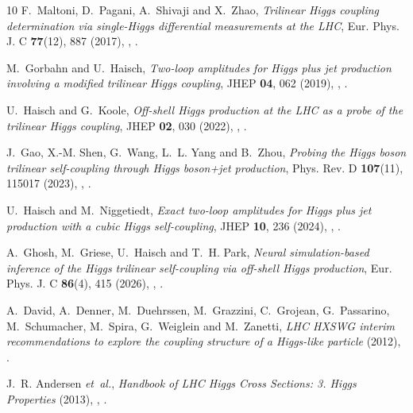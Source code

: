 \documentclass{SciPost}
\begin{document}
\begin{thebibliography}{10}
F.~Maltoni, D.~Pagani, A.~Shivaji and X.~Zhao,
\newblock \emph{{Trilinear Higgs coupling determination via single-Higgs differential measurements at the LHC}},
\newblock Eur. Phys. J. C \textbf{77}(12), 887 (2017),
\newblock {},
\newblock {}.

M.~Gorbahn and U.~Haisch,
\newblock \emph{{Two-loop amplitudes for Higgs plus jet production involving a modified trilinear Higgs coupling}},
\newblock JHEP \textbf{04}, 062 (2019),
\newblock {},
\newblock {}.

U.~Haisch and G.~Koole,
\newblock \emph{{Off-shell Higgs production at the LHC as a probe of the trilinear Higgs coupling}},
\newblock JHEP \textbf{02}, 030 (2022),
\newblock {},
\newblock {}.

J.~Gao, X.-M. Shen, G.~Wang, L.~L. Yang and B.~Zhou,
\newblock \emph{{Probing the Higgs boson trilinear self-coupling through Higgs boson+jet production}},
\newblock Phys. Rev. D \textbf{107}(11), 115017 (2023),
\newblock {},
\newblock {}.

U.~Haisch and M.~Niggetiedt,
\newblock \emph{{Exact two-loop amplitudes for Higgs plus jet production with a cubic Higgs self-coupling}},
\newblock JHEP \textbf{10}, 236 (2024),
\newblock {},
\newblock {}.

A.~Ghosh, M.~Griese, U.~Haisch and T.~H. Park,
\newblock \emph{{Neural simulation-based inference of the Higgs trilinear self-coupling via off-shell Higgs production}},
\newblock Eur. Phys. J. C \textbf{86}(4), 415 (2026),
\newblock {},
\newblock {}.

A.~David, A.~Denner, M.~Duehrssen, M.~Grazzini, C.~Grojean, G.~Passarino, M.~Schumacher, M.~Spira, G.~Weiglein and M.~Zanetti,
\newblock \emph{{LHC HXSWG interim recommendations to explore the coupling structure of a Higgs-like particle}}  (2012),
\newblock {}.

J.~R. Andersen \emph{et~al.},
\newblock \emph{{Handbook of LHC Higgs Cross Sections: 3. Higgs Properties}}  (2013),
\newblock {},
\newblock {}.


\end{thebibliography}
\end{document}
